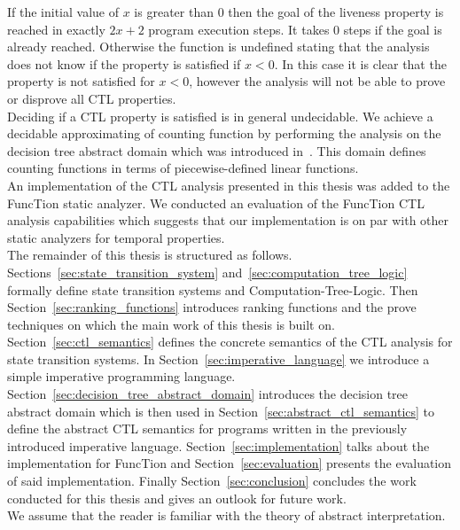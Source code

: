 \documentclass[11pt,a4paper,titlepage]{article}
\theoremstyle{definition}
\begin{document}
If the initial value of $x$ is greater than $0$ then the goal of the liveness property is reached in exactly $2x + 2$ program execution steps.
It takes $0$ steps if the goal is already reached. Otherwise the function is undefined stating that the analysis does not know if the property 
is satisfied if $x < 0$. In this case it is clear that the property is not satisfied for $x < 0$, however the analysis will not be able to 
prove or disprove all CTL properties.\\

Deciding if a CTL property is satisfied is in general undecidable. We achieve a decidable approximating of counting function by performing
the analysis on the decision tree abstract domain which was introduced in~\cite{UrbanPhd}. This domain defines counting functions in terms of 
piecewise-defined linear functions.\\

An implementation of the CTL analysis presented in this thesis was added to the FuncTion static analyzer. 
We conducted an evaluation of the FuncTion CTL analysis capabilities which suggests that our implementation is on par with other static analyzers
for temporal properties.\\

The remainder of this thesis is structured as follows. 
Sections~\ref{sec:state_transition_system} and~\ref{sec:computation_tree_logic} formally define state transition systems and Computation-Tree-Logic.
Then Section~\ref{sec:ranking_functions} introduces ranking functions and the prove techniques on which the main work of this thesis is built on. 
Section~\ref{sec:ctl_semantics} defines the concrete semantics of the CTL analysis for state transition systems. 
In Section~\ref{sec:imperative_language} we introduce a simple imperative programming language. 
Section~\ref{sec:decision_tree_abstract_domain} introduces the decision tree abstract domain which is then used in Section~\ref{sec:abstract_ctl_semantics} 
to define the abstract CTL semantics for programs written in the previously introduced imperative language. 
Section~\ref{sec:implementation} talks about the implementation for 
FuncTion and Section~\ref{sec:evaluation} presents the evaluation of said implementation. 
Finally Section~\ref{sec:conclusion} concludes the work conducted for this thesis and gives an outlook for future work.\\

We assume that the reader is familiar with the theory of abstract interpretation. 
\end{document}
